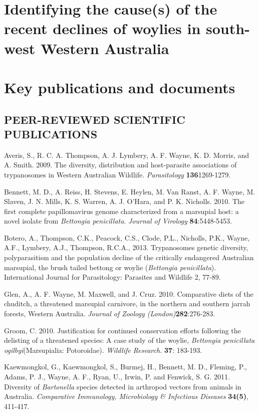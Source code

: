 \documentclass[version=last,
    paper=a4,                               %
    10pt,                                   %
    dvipsnames,
    oneside,                              %
    headings=openany,                       %
    open=any,
    BCOR=7mm,                               %
    DIV=15,     %
]{scrbook}
\begin{document}
\section*{Identifying the cause(s) of the recent declines of woylies in south-west
Western Australia
}



\section*{Key publications and documents}

\subsection{PEER-REVIEWED SCIENTIFIC PUBLICATIONS}

Averis, S., R. C. A. Thompson, A. J. Lymbery, A. F. Wayne, K. D. Morris,
and A. Smith. 2009. The diversity, distribution and host-parasite
associations of trypanosomes in Western Australian Wildlife.
\emph{Parasitology} \textbf{136}1269-1279.

Bennett, M. D., A. Reiss, H. Stevens, E. Heylen, M. Van Ranst, A. F.
Wayne, M. Slaven, J. N. Mills, K. S. Warren, A. J. O'Hara, and P. K.
Nicholls. 2010. The first complete papillomavirus genome characterized
from a marsupial host: a novel isolate from \emph{Bettongia
penicillata}. \emph{Journal of Virology} \textbf{84}:5448-5453.

Botero, A., Thompson, C.K., Peacock, C.S., Clode, P.L., Nicholls, P.K.,
Wayne, A.F., Lymbery, A.J., Thompson, R.C.A., 2013. Trypanosomes genetic
diversity, polyparasitism and the population decline of the critically
endangered Australian marsupial, the brush tailed bettong or woylie
(\emph{Bettongia penicillata}). International Journal for Parasitology:
Parasites and Wildlife 2, 77-89.

Glen, A., A. F. Wayne, M. Maxwell, and J. Cruz. 2010. Comparative diets
of the chuditch, a threatened marsupial carnivore, in the northern and
southern jarrah forests, Western Australia. \emph{Journal of Zoology
(London)}\textbf{282}:276-283.

Groom, C. 2010. Justification for continued conservation efforts
following the delisting of a threatened species: A case study of the
woylie, \emph{Bettongia penicillata ogilbyi}(Marsupialia: Potoroidae).
\emph{Wildlife Research}\emph{.} \textbf{37}: 183-193.

Kaewmongkol, G., Kaewmongkol, S., Burmej, H., Bennett, M. D., Fleming,
P., Adams, P. J., Wayne, A. F., Ryan, U., Irwin, P. and Fenwick, S. G.
2011. Diversity of \emph{Bartonella} species detected in arthropod
vectors from animals in Australia. \emph{Comparative Immunology,
Microbiology \& Infectious Diseases} \textbf{34(5)}, 411-417.
\end{document}
